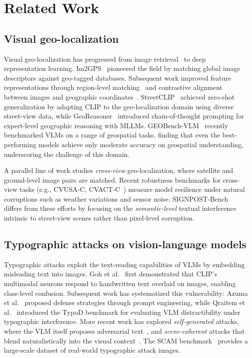 \documentclass[12pt,a4paper]{article}
\begin{document}
\section{Related Work}

\subsection{Visual geo-localization}
Visual geo-localization has progressed from image retrieval~\cite{im2gps} to deep representation learning. Im2GPS~\cite{im2gps} pioneered the field by matching global image descriptors against geo-tagged databases. Subsequent work improved feature representations through region-level matching~\cite{pigeon} and contrastive alignment between images and geographic coordinates~\cite{geoclip}. StreetCLIP~\cite{streetclip} achieved zero-shot generalization by adapting CLIP to the geo-localization domain using diverse street-view data, while GeoReasoner~\cite{georeasoner} introduced chain-of-thought prompting for expert-level geographic reasoning with MLLMs. GEOBench-VLM~\cite{geobenchvlm} recently benchmarked VLMs on a range of geospatial tasks, finding that even the best-performing models achieve only moderate accuracy on geospatial understanding, underscoring the challenge of this domain.

A parallel line of work studies \emph{cross-view} geo-localization, where satellite and ground-level image pairs are matched. Recent robustness benchmarks for cross-view tasks (e.g., CVUSA-C, CVACT-C~\cite{crossview_robustness}) measure model resilience under natural corruptions such as weather variations and sensor noise. SIGNPOST-Bench differs from these efforts by focusing on the \emph{semantic-level} textual interference intrinsic to street-view scenes rather than pixel-level corruption.

\subsection{Typographic attacks on vision-language models}
Typographic attacks exploit the text-reading capabilities of VLMs by embedding misleading text into images. Goh et al.~\cite{typographic_attack} first demonstrated that CLIP's multimodal neurons respond to handwritten text overlaid on images, enabling class-level confusion. Subsequent work has systematized this vulnerability: Azuma et al.~\cite{azuma2023defense} proposed defense strategies through prompt engineering, while Qraitem et al.~\cite{qraitem2024typo} introduced the TypoD benchmark for evaluating VLM distractibility under typographic interference. More recent work has explored \emph{self-generated} attacks, where the VLM itself proposes adversarial text~\cite{selfgenerated_typo}, and \emph{scene-coherent} attacks that blend naturalistically into the visual context~\cite{scenecoherent_typo}. The SCAM benchmark~\cite{scam} provides a large-scale dataset of real-world typographic attack images.
\end{document}

